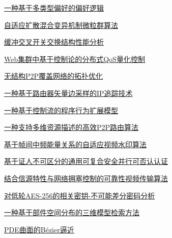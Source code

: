 \documentclass[a4paper]{article}
\begin{document}
\href{http://www.jos.org.cn/ch/reader/download_pdf.aspx?file_no=20071107&year_id=2007&quarter_id=11&falg=1}{一种基于多类型偏好的偏好逻辑}

\href{http://www.jos.org.cn/ch/reader/download_pdf.aspx?file_no=20071108&year_id=2007&quarter_id=11&falg=1}{自适应扩散混合变异机制微粒群算法}

\href{http://www.jos.org.cn/ch/reader/download_pdf.aspx?file_no=20071112&year_id=2007&quarter_id=11&falg=1}{缓冲交叉开关交换结构性能分析}

\href{http://www.jos.org.cn/ch/reader/download_pdf.aspx?file_no=20071113&year_id=2007&quarter_id=11&falg=1}{Web集群中基于控制论的分布式QoS量化控制}

\href{http://www.jos.org.cn/ch/reader/download_pdf.aspx?file_no=20071114&year_id=2007&quarter_id=11&falg=1}{无结构P2P覆盖网络的拓扑优化}

\href{http://www.jos.org.cn/ch/reader/download_pdf.aspx?file_no=20071115&year_id=2007&quarter_id=11&falg=1}{一种基于路由器矢量边采样的IP追踪技术}

\href{http://www.jos.org.cn/ch/reader/download_pdf.aspx?file_no=20071116&year_id=2007&quarter_id=11&falg=1}{一种基于控制流的程序行为扩展模型}

\href{http://www.jos.org.cn/ch/reader/download_pdf.aspx?file_no=20071117&year_id=2007&quarter_id=11&falg=1}{一种支持多维资源描述的高效P2P路由算法}

\href{http://www.jos.org.cn/ch/reader/download_pdf.aspx?file_no=20071118&year_id=2007&quarter_id=11&falg=1}{基于帧间中频能量关系的自适应视频水印算法}

\href{http://www.jos.org.cn/ch/reader/download_pdf.aspx?file_no=20071119&year_id=2007&quarter_id=11&falg=1}{基于证人不可区分的通用可复合安全并行可否认认证}

\href{http://www.jos.org.cn/ch/reader/download_pdf.aspx?file_no=20071120&year_id=2007&quarter_id=11&falg=1}{结合信源特性与网络拥塞控制的可靠性视频传输算法}

\href{http://www.jos.org.cn/ch/reader/download_pdf.aspx?file_no=20071121&year_id=2007&quarter_id=11&falg=1}{对低轮AES-256的相关密钥-不可能差分密码分析}

\href{http://www.jos.org.cn/ch/reader/download_pdf.aspx?file_no=20071122&year_id=2007&quarter_id=11&falg=1}{一种基于部件空间分布的三维模型检索方法}

\href{http://www.jos.org.cn/ch/reader/download_pdf.aspx?file_no=20071123&year_id=2007&quarter_id=11&falg=1}{PDE曲面的Bézier逼近}
\end{document}
